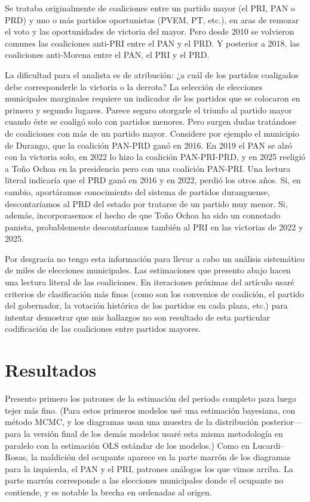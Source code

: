 \documentclass[letter,12pt]{article}
\begin{document}
Se trataba originalmente de coaliciones entre un partido mayor (el PRI, PAN o PRD) y uno o más partidos oportunistas (PVEM, PT, etc.), en aras de remozar el voto y las oportunidades de victoria del mayor. Pero desde 2010 se volvieron comunes las coaliciones anti-PRI entre el PAN y el PRD. Y posterior a 2018, las coaliciones anti-Morena entre el PAN, el PRI y el PRD.

La dificultad para el analista es de atribución: ¿a cuál de los partidos coaligados debe corresponderle la victoria o la derrota? La selección de elecciones municipales marginales requiere un indicador de los partidos que se colocaron en primero y segundo lugares. Parece seguro otorgarle el triunfo al partido mayor cuando éste se coaligó solo con partidos menores. Pero surgen dudas tratándose de coaliciones con más de un partido mayor. Considere por ejemplo el municipio de Durango, que la coalición PAN-PRD ganó en 2016. En 2019 el PAN se alzó con la victoria solo, en 2022 lo hizo la coalición PAN-PRI-PRD, y en 2025 reeligió a Toño Ochoa en la presidencia pero con una coalición PAN-PRI. Una lectura literal indicaría que el PRD ganó en 2016 y en 2022, perdió los otros años. Si, en cambio, aportáramos conocimiento del sistema de partidos duranguense, descontaríamos al PRD del estado por tratarse de un partido muy menor. Si, además, incorporasemos el hecho de que Toño Ochoa ha sido un connotado panista, probablemente descontaríamos también al PRI en las victorias de 2022 y 2025.

Por desgracia no tengo esta información para llevar a cabo un análisis sistemático de miles de elecciones municipales. Las estimaciones que presento abajo hacen una lectura literal de las coaliciones. En iteraciones próximas del artículo usaré criterios de clasificación más finos (como son los convenios de coalición, el partido del gobernador, la votación histórica de los partidos en cada plaza, etc.) para intentar demostrar que mis hallazgos no son resultado de esta particular codificación de las coaliciones entre partidos mayores. 

\section{Resultados}

\noindent Presento primero los patrones de la estimación del periodo completo para luego tejer más fino. (Para estos primeros modelos usé una estimación bayesiana, con método MCMC, y los diagramas usan una muestra de la distribución posterior---para la versión final de los demás modelos usaré esta misma metodología en paralelo con la estimación OLS estándar de los modelos.) Como en Lucardi--Rosas, la maldición del ocupante aparece en la parte marrón de los diagramas para la izquierda, el PAN y el PRI, patrones análogos los que vimos arriba. La parte marrón corresponde a las elecciones municipales donde el ocupante no contiende, y es notable la brecha en ordenadas al origen.
\end{document}
